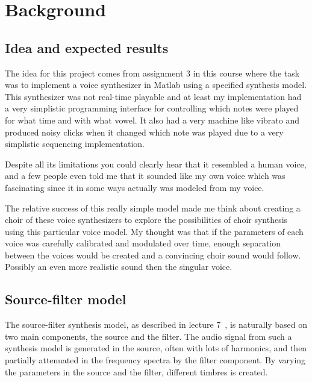 \documentclass{article}
\title{\papertitle}
\begin{document}
%
\capstartfalse
\maketitle
\capstarttrue
%
\begin{abstract}
Lorem Ipsum
\end{abstract}
\section{Background}\label{sec:introduction}

\subsection{Idea and expected results}
The idea for this project comes from assignment 3 in this course where the task was to implement a voice synthesizer in Matlab using a specified synthesis model. This synthesizer was not real-time playable and at least my implementation had a very simplistic programming interface for controlling which notes were played for what time and with what vowel. It also had a very machine like vibrato and produced noisy clicks when it changed which note was played due to a very simplistic sequencing implementation.

Despite all its limitations you could clearly hear that it resembled a human voice, and a few people even told me that it sounded like my own voice which was fascinating since it in some ways actually was modeled from my voice.

The relative success of this really simple model made me think about creating a choir of these voice synthesizers to explore the possibilities of choir synthesis using this particular voice model. My thought was that if the parameters of each voice was carefully calibrated and modulated over time, enough separation between the voices would be created and a convincing choir sound would follow. Possibly an even more realistic sound then the singular voice.

\subsection{Source-filter model}
The source-filter synthesis model, as described in lecture 7~\cite{ternstrom7:20}, is naturally based on two main components, the source and the filter. The audio signal from such a synthesis model is generated in the source, often with lots of harmonics, and then partially attenuated in the frequency spectra by the filter component. By varying the parameters in the source and the filter, different timbres is created.
\end{document}
